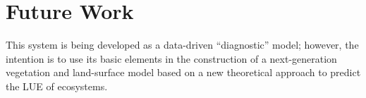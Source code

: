 %
%
%
%
%
\section{Future Work}
\label{sec:future}
This system is being developed as a data-driven ``diagnostic'' model; however, the intention is to use its basic elements in the construction of a next-generation vegetation and land-surface model based on a new theoretical approach to predict the LUE of ecosystems.